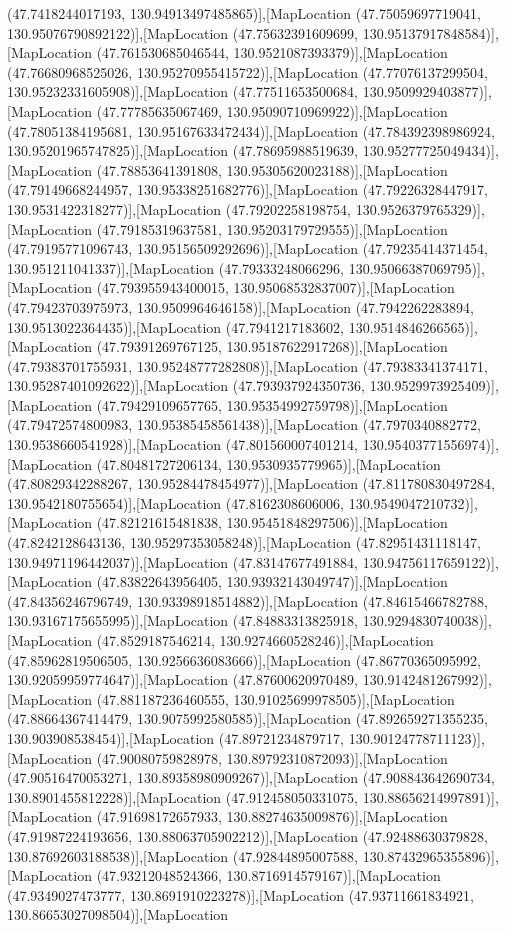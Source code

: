 (47.7418244017193, 130.94913497485865)],[MapLocation (47.75059697719041, 130.95076790892122)],[MapLocation (47.75632391609699, 130.95137917848584)],[MapLocation (47.761530685046544, 130.9521087393379)],[MapLocation (47.76680968525026, 130.95270955415722)],[MapLocation (47.77076137299504, 130.95232331605908)],[MapLocation (47.77511653500684, 130.9509929403877)],[MapLocation (47.77785635067469, 130.95090710969922)],[MapLocation (47.78051384195681, 130.95167633472434)],[MapLocation (47.784392398986924, 130.95201965747825)],[MapLocation (47.78695988519639, 130.95277725049434)],[MapLocation (47.78853641391808, 130.95305620023188)],[MapLocation (47.79149668244957, 130.95338251682776)],[MapLocation (47.79226328447917, 130.9531422318277)],[MapLocation (47.79202258198754, 130.9526379765329)],[MapLocation (47.79185319637581, 130.95203179729555)],[MapLocation (47.79195771096743, 130.95156509292696)],[MapLocation (47.79235414371454, 130.951211041337)],[MapLocation (47.79333248066296, 130.95066387069795)],[MapLocation (47.793955943400015, 130.95068532837007)],[MapLocation (47.79423703975973, 130.9509964646158)],[MapLocation (47.7942262283894, 130.9513022364435)],[MapLocation (47.7941217183602, 130.9514846266565)],[MapLocation (47.79391269767125, 130.95187622917268)],[MapLocation (47.79383701755931, 130.95248777282808)],[MapLocation (47.79383341374171, 130.95287401092622)],[MapLocation (47.793937924350736, 130.9529973925409)],[MapLocation (47.79429109657765, 130.95354992759798)],[MapLocation (47.79472574800983, 130.95385458561438)],[MapLocation (47.7970340882772, 130.9538660541928)],[MapLocation (47.801560007401214, 130.95403771556974)],[MapLocation (47.80481727206134, 130.9530935779965)],[MapLocation (47.80829342288267, 130.95284478454977)],[MapLocation (47.811780830497284, 130.9542180755654)],[MapLocation (47.8162308606006, 130.9549047210732)],[MapLocation (47.82121615481838, 130.95451848297506)],[MapLocation (47.8242128643136, 130.95297353058248)],[MapLocation (47.82951431118147, 130.94971196442037)],[MapLocation (47.83147677491884, 130.94756117659122)],[MapLocation (47.83822643956405, 130.93932143049747)],[MapLocation (47.84356246796749, 130.93398918514882)],[MapLocation (47.84615466782788, 130.93167175655995)],[MapLocation (47.84883313825918, 130.9294830740038)],[MapLocation (47.8529187546214, 130.9274660528246)],[MapLocation (47.85962819506505, 130.9256636083666)],[MapLocation (47.86770365095992, 130.92059959774647)],[MapLocation (47.87600620970489, 130.9142481267992)],[MapLocation (47.881187236460555, 130.91025699978505)],[MapLocation (47.88664367414479, 130.9075992580585)],[MapLocation (47.892659271355235, 130.903908538454)],[MapLocation (47.89721234879717, 130.90124778711123)],[MapLocation (47.90080759828978, 130.89792310872093)],[MapLocation (47.90516470053271, 130.89358980909267)],[MapLocation (47.908843642690734, 130.8901455812228)],[MapLocation (47.912458050331075, 130.88656214997891)],[MapLocation (47.91698172657933, 130.88274635009876)],[MapLocation (47.91987224193656, 130.88063705902212)],[MapLocation (47.92488630379828, 130.87692603188538)],[MapLocation (47.92844895007588, 130.87432965355896)],[MapLocation (47.93212048524366, 130.8716914579167)],[MapLocation (47.9349027473777, 130.8691910223278)],[MapLocation (47.93711661834921, 130.86653027098504)],[MapLocation 